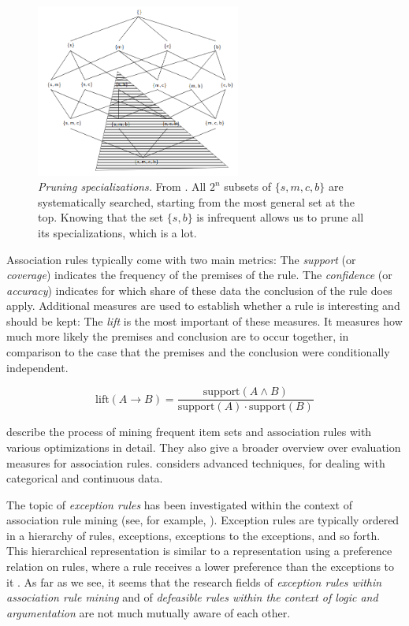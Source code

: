 \begin{figure}[htb]
        \centering
        \includegraphics[width=0.6\textwidth]{images/pruning.png}
        \caption{\textit{Pruning specializations.} From \citet[p.~52]{deraedtLogicalRelationalLearning2008}. All $2^n$ subsets of $\{s, m, c, b\}$ are systematically searched, starting from the most general set at the top. Knowing that the set $\{s, b\}$ is infrequent allows us to prune all its specializations, which is a lot. }
        \label{fig:pruning}
\end{figure}

Association rules typically come with two main metrics: The \textit{support} (or \textit{coverage}) indicates the frequency of the premises of the rule. The \textit{confidence} (or \textit{accuracy}) indicates for which share of these data the conclusion of the rule does apply. Additional measures are used to establish whether a rule is interesting and should be kept: The \textit{lift} is the most important of these measures. It measures how much more likely the premises and conclusion are to occur together, in comparison to the case that the premises and the conclusion were conditionally independent. 

$$\text{lift}(A\rightarrow B)=\frac{\text{support}(A \land B)}{\text{support}(A)\cdot\text{support}(B)}$$

\citet[ch.~6]{tanIntroductionDataMining2014} describe the process of mining frequent item sets and association rules with various optimizations in detail. They also give a broader overview over evaluation measures for association rules. \cite[ch.~7]{tanIntroductionDataMining2014} considers advanced techniques, for dealing with categorical and continuous data. 

The topic of \textit{exception rules} has been investigated within the context of association rule mining (see, for example, \citet{taniarExceptionRulesAssociation2008}). Exception rules are typically ordered in a hierarchy of rules, exceptions, exceptions to the exceptions, and so forth. This hierarchical representation is similar to a representation using a preference relation on rules, where a rule receives a lower preference than the exceptions to it \citep[p.~81f.]{wittenDataMiningPractical2017}. As far as we see, it seems that the research fields of \textit{exception rules within association rule mining} and of \textit{defeasible rules within the context of logic and argumentation} are not much mutually aware of each other.

